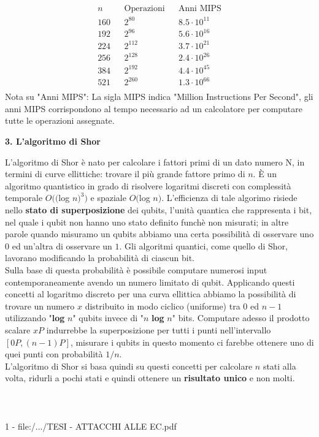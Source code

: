 \documentclass[a4paper,12pt]{tesiinfo}
\begin{document}
\begin{align*}
    &n& &\text{Operazioni}& &\text{Anni MIPS}&\\
    &160& &2^{80}& &8.5 \cdot 10^{11}&\\
    &192& &2^{96}& &5.6 \cdot 10^{16}&\\
    &224& &2^{112}& &3.7 \cdot 10^{21}&\\
    &256& &2^{128}& &2.4 \cdot 10^{26}&\\
    &384& &2^{192}& &4.4 \cdot 10^{45}&\\
    &521& &2^{260}& &1.3 \cdot 10^{66}&\\
\end{align*}
Nota su "Anni MIPS": La sigla MIPS indica "Million Instructions Per Second", gli anni MIPS corrispondono al tempo necessario ad un calcolatore per computare tutte le operazioni assegnate.
\begin{center}
    \textbf{3. L'algoritmo di Shor}
\end{center}
L'algoritmo di Shor \`e nato per calcolare i fattori primi di un dato numero N, in termini di curve ellittiche: trovare il pi\`u grande fattore primo di $n$. \`E un algoritmo quantistico in grado di risolvere logaritmi discreti con complessit\`a temporale $O(($log $n)^3)$ e spaziale $O($log $n)$. L'efficienza di tale algorimo risiede nello \textbf{stato di superposizione} dei qubits, l'unit\`a quantica che rappresenta i bit, nel quale i qubit non hanno uno stato definito funch\`e non misurati; in altre parole quando misuramo un qubits abbiamo una certa possibilit\`a di osservare uno $0$ ed un'altra di osservare un $1$. Gli algoritmi quantici, come quello di Shor, lavorano modificando la probabilit\`a di ciascun bit.
\\
Sulla base di questa probabilit\`a \`e possibile computare numerosi input contemporaneamente avendo un numero limitato di qubit. Applicando questi concetti al logaritmo discreto per una curva ellittica abbiamo la possibilit\`a di trovare un numero $x$ distribuito in modo ciclico (uniforme) tra $0$ ed $n-1$ utilizzando "\textbf{log }$n$" qubits invece di "$n$\textbf{ log }$n$" bits. Computare adesso il prodotto scalare $xP$ indurrebbe la superposizione per tutti i punti nell'intervallo $[0P, (n-1)P]$, misurare i qubits in questo momento ci farebbe ottenere uno di quei punti con probabilit\`a $1 \big / n$.
\\
L'algoritmo di Shor si basa quindi su questi concetti per calcolare $n$ stati alla volta, ridurli a pochi stati e quindi ottenere un \textbf{risultato unico} e non molti.
%
%
\\
\\
\\
\\1 - file:/.../TESI - ATTACCHI ALLE EC.pdf
%
%
%
%
%
%
%
%
\end{document}
